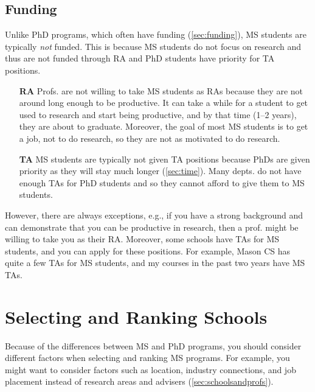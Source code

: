 \documentclass[oneside,11pt,dvipsnames]{book}
\newcommand{\sectioninfo}[1]{%
  \phantomsection
  \addcontentsline{toc}{sectioninfo}{\textcolor{black}{\emph{#1}}}%
}
\begin{document}
\subsection{Funding}\label{sec:ms-funding}
Unlike PhD programs, which often have funding (\autoref{sec:funding}), MS students are typically \emph{not} funded. This is because MS students do not focus on research and thus are not funded through RA and PhD students have priority for TA positions. 

\begin{itemize}
\item[\textbf{RA}] Profs. are not willing to take MS students as RAs because they are not around long enough to be productive. It can take a while for a student to get used to research and start being productive, and by that time (1--2 years), they are about to graduate. Moreover, the goal of most MS students is to get a job, not to do research, so they are not as motivated to do research.

\item[\textbf{TA}] MS students are typically not given TA positions because PhDs are given priority as they will stay much longer (\autoref{sec:time}). Many depts. do not have enough TAs for PhD students and so they cannot afford to give them to MS students.
\end{itemize}

However, there are always exceptions, e.g., if you have a strong background and can demonstrate that you can be productive in research, then a prof. might be willing to take you as their RA.
Moreover, some schools have TAs for MS students, and you can apply for these positions. For example, Mason CS has quite a few TAs for MS students, and my courses in the past two years have MS TAs.

\section{Selecting and Ranking Schools}\label{sec:selecting-ranking-schools-ms}

Because of the differences between MS and PhD programs, you should consider different factors when selecting and ranking MS programs. For example, you might want to consider factors such as location, industry connections, and job placement instead of research areas and advisers (\autoref{sec:schoolsandprofs}).
\end{document}
